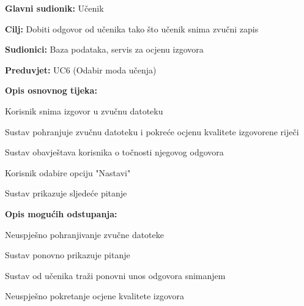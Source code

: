 					\noindent {}
					\begin{packed_item}
						
						\item \textbf{Glavni sudionik: }Učenik
						\item  \textbf{Cilj:} Dobiti odgovor od učenika tako što učenik snima zvučni zapis
						\item  \textbf{Sudionici:} Baza podataka, servis za ocjenu izgovora
						\item  \textbf{Preduvjet:} UC6 (Odabir moda učenja)
						\item  \textbf{Opis osnovnog tijeka:}
						
						\item[] \begin{packed_enum}
							
							\item Korisnik snima izgovor u zvučnu datoteku
							\item Sustav pohranjuje zvučnu datoteku i pokreće ocjenu kvalitete izgovorene riječi
							\item Sustav obavještava korisnika o točnosti njegovog odgovora
							\item Korisnik odabire opciju "Nastavi"
							\item Sustav prikazuje sljedeće pitanje
						\end{packed_enum}
						
						\item  \textbf{Opis mogućih odstupanja:}
						
						\item[] \begin{packed_item}
							
								
							\item[2.a] Neuspješno pohranjivanje zvučne datoteke 
							\item[] \begin{packed_enum}
								
								\item Sustav ponovno prikazuje pitanje
								\item Sustav od učenika traži ponovni unos odgovora snimanjem
								
							\end{packed_enum}
								
							\item[2.b] Neuspješno pokretanje ocjene kvalitete izgovora 
							\item[] \begin{packed_enum}
								

\end{packed_enum}
\end{packed_item}
\end{packed_item}
